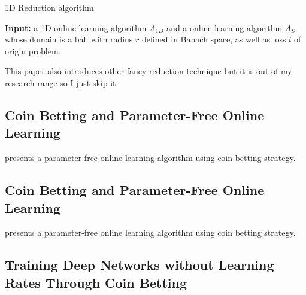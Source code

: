 \begin{algorithm}
\caption{1D Reduction algorithm}
\label{alg:1DReduction}
{\bfseries Input:} a 1D online learning algorithm $A_{1D}$ and a online learning algorithm $A_S$ whose domain is a ball with radius $r$ defined in Banach space, as well as loss $l$ of origin problem.
\begin{algorithmic}[1]
\EndFor
\end{algorithmic}
\end{algorithm}

This paper also introduces other fancy reduction technique but it is out of my research range so I just skip it.

\subsection{Coin Betting and Parameter-Free Online Learning}
\cite{Orabona2016} presents a parameter-free online learning algorithm using coin betting strategy. 

\subsection{Coin Betting and Parameter-Free Online Learning}
\cite{Orabona2016} presents a parameter-free online learning algorithm using coin betting strategy. 

\subsection{Training Deep Networks without Learning Rates Through Coin Betting}
\cite{Orabona2017}

